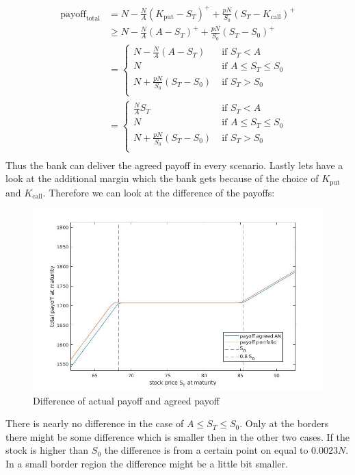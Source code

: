 \documentclass[11pt,oneside,a4paper]{article}
\begin{document}
	\begin{align*}
		\text{payoff}_{\text{total}} &= N - \frac{N}{A}(K_{\text{put}}-S_T)^+ + \frac{pN}{S_0}(S_T-K_{\text{call}})^+ \\
		&\geq N - \frac{N}{A}(A-S_T)^+ + \frac{pN}{S_0}(S_T-S_0)^+ \\
		&= \begin{cases}
		N - \frac{N}{A}(A - S_T) \; &\text{if } S_T < A \\
		N  \; &\text{if } A \leq S_T \leq S_0 \\
		N + \frac{pN}{S_0}(S_T-S_0) \; &\text{if }S_T > S_0 \\
		\end{cases} \\
		&= \begin{cases}
		\frac{N}{A} S_T \; &\text{if } S_T < A \\
		N  \; &\text{if } A \leq S_T \leq S_0 \\
		N + \frac{pN}{S_0}(S_T-S_0) \; &\text{if }S_T > S_0 \\
		\end{cases} \\
	\end{align*}
	Thus the bank can deliver the agreed payoff in every scenario.
	Lastly lets have a look at the additional margin which the bank gets because of the choice of $ K_\text{put} $ and $ K_{\text{call}} $. Therefore we can look at the difference of the payoffs:
	\begin{figure}[H]
		\centering
		\includegraphics[width=0.8\linewidth]{differenceAN.jpg}
		\caption{Difference of actual payoff and agreed payoff}
	\end{figure}
	There is nearly no difference in the case of $ A \leq S_T \leq S_0  $. Only at the borders there might be some difference which is smaller then in the other two cases.
	If the stock is higher than $ S_0 $ the difference is from a certain point on equal to $ 0.0023N $. In a small border region the difference might be a little bit smaller.
\end{document}
